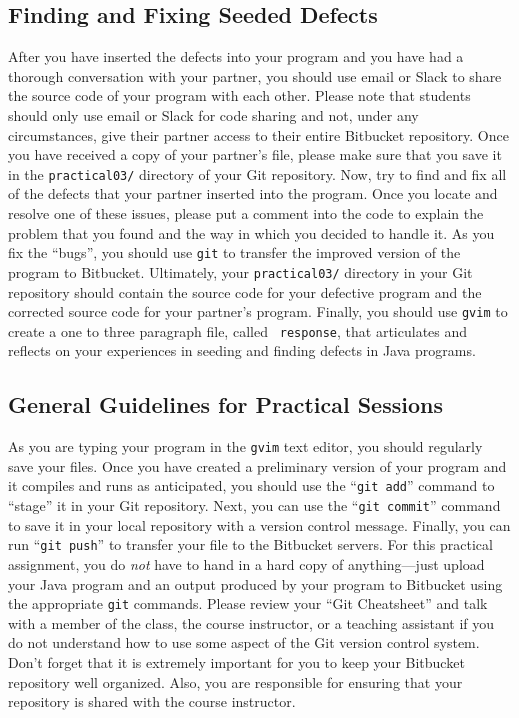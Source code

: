 \vspace*{-.15in}
\subsection*{Finding and Fixing Seeded Defects}
\vspace*{-.075in}

After you have inserted the defects into your program and you have had a thorough conversation with your partner, you
should use email or Slack to share the source code of your program with each other. Please note that students should
only use email or Slack for code sharing and not, under any circumstances, give their partner access to their entire
Bitbucket repository. Once you have received a copy of your partner's file, please make sure that you save it in the
{\tt practical03/} directory of your Git repository. Now, try to find and fix all of the defects that your partner
inserted into the program. Once you locate and resolve one of these issues, please put a comment into the code to
explain the problem that you found and the way in which you decided to handle it. As you fix the ``bugs'', you should
use {\tt git} to transfer the improved version of the program to Bitbucket. Ultimately, your {\tt practical03/}
directory in your Git repository should contain the source code for your defective program and the corrected source code
for your partner's program. Finally, you should use {\tt gvim} to create a one to three paragraph file, called {\tt
response}, that articulates and reflects on your experiences in seeding and finding defects in Java programs.

\vspace*{-.15in}
\subsection*{General Guidelines for Practical Sessions}
\vspace*{-.075in}

As you are typing your program in the {\tt gvim} text editor, you should regularly save your files.  Once you have
created a preliminary version of your program and it compiles and runs as anticipated, you should use the ``{\tt git
add}'' command to ``stage'' it in your Git repository.  Next, you can use the ``{\tt git commit}'' command to save it in
your local repository with a version control message.  Finally, you can run ``{\tt git push}'' to transfer your file to
the Bitbucket servers.  For this practical assignment, you do {\em not} have to hand in a hard copy of anything---just
upload your Java program and an output produced by your program to Bitbucket using the appropriate {\tt git} commands.
Please review your ``Git Cheatsheet'' and talk with a member of the class, the course instructor, or a teaching
assistant if you do not understand how to use some aspect of the Git version control system. Don't forget that it is
extremely important for you to keep your Bitbucket repository well organized. Also, you are responsible for ensuring
that your repository is shared with the course instructor.

